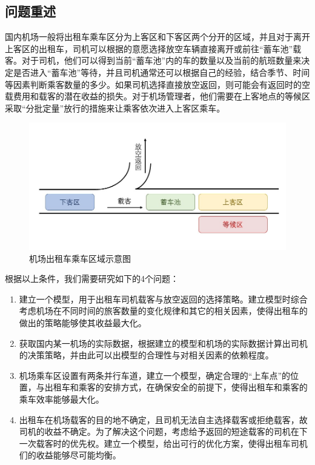 \documentclass{cumcm}
\begin{document}
\subsection{问题重述}
国内机场一般将出租车乘车区分为上客区和下客区两个分开的区域，并且对于离开上客区的出租车，司机可以根据的意愿选择放空车辆直接离开或前往“蓄车池”载客。对于司机，他们可以得到当前“蓄车池”内的车的数量以及当前的航班数量来决定是否进入“蓄车池”等待，并且司机通常还可以根据自己的经验，结合季节、时间等因素判断乘客数量的多少。如果司机选择直接放空返回，则可能会有返回时的空载费用和载客的潜在收益的损失。对于机场管理者，他们需要在上客地点的等候区采取“分批定量”放行的措施来让乘客依次进入上客区乘车。\par
\begin{figure}[H]
	\centering
	\includegraphics[width=1.0\textwidth]{img/taxi_example.jpg}
	\caption{机场出租车乘车区域示意图}
	\label{taxi_example}
\end{figure}
根据以上条件，我们需要研究如下的4个问题：
\begin{enumerate}[(1)]
	\item 建立一个模型，用于出租车司机载客与放空返回的选择策略。建立模型时综合考虑机场在不同时间的旅客数量的变化规律和其它的相关因素，使得出租车的做出的策略能够使其收益最大化。
	\item 获取国内某一机场的实际数据，根据建立的模型和机场的实际数据计算出司机的决策策略，并由此可以出模型的合理性与对相关因素的依赖程度。
	\item 机场乘车区设置有两条并行车道，建立一个模型，确定合理的“上车点”的位置，与出租车和乘客的安排方式，在确保安全的前提下，使得出租车和乘客的乘车效率能够最大化。
	\item 出租车在机场载客的目的地不确定，且司机无法自主选择载客或拒绝载客，故司机的收益不确定。为了解决这个问题，考虑给予返回的短途载客的司机在下一次载客时的优先权。建立一个模型，给出可行的优化方案，使得出租车司机们的收益能够尽可能均衡。
\end{enumerate}
\end{document}
